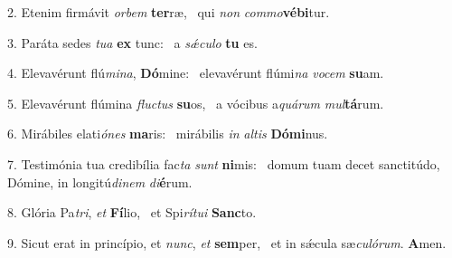 2. Etenim firmávit \textit{or}\textit{bem} \textbf{ter}ræ, \ast\  qui \textit{non} \textit{com}\textit{mo}\textbf{vé}\textbf{bi}tur.\

3. Paráta sedes \textit{tu}\textit{a} \textbf{ex} tunc: \ast\  a \textit{sǽ}\textit{cu}\textit{lo} \textbf{tu} es.\

4. Elevavérunt flú\textit{mi}\textit{na}, \textbf{Dó}mine: \ast\  elevavérunt flúmi\textit{na} \textit{vo}\textit{cem} \textbf{su}am.\

5. Elevavérunt flúmina \textit{fluc}\textit{tus} \textbf{su}os, \ast\  a vócibus a\textit{quá}\textit{rum} \textit{mul}\textbf{tá}rum.\

6. Mirábiles elati\textit{ó}\textit{nes} \textbf{ma}ris: \ast\  mirábilis \textit{in} \textit{al}\textit{tis} \textbf{Dó}\textbf{mi}nus.\

7. Testimónia tua credibília fac\textit{ta} \textit{sunt} \textbf{ni}mis: \ast\  domum tuam decet sanctitúdo, Dómine, in longitú\textit{di}\textit{nem} \textit{di}\textbf{é}rum.\

8. Glória Pa\textit{tri}, \textit{et} \textbf{Fí}lio, \ast\  et Spi\textit{rí}\textit{tu}\textit{i} \textbf{Sanc}to.\

9. Sicut erat in princípio, et \textit{nunc}, \textit{et} \textbf{sem}per, \ast\  et in sǽcula sæ\textit{cu}\textit{ló}\textit{rum}. \textbf{A}men.\

